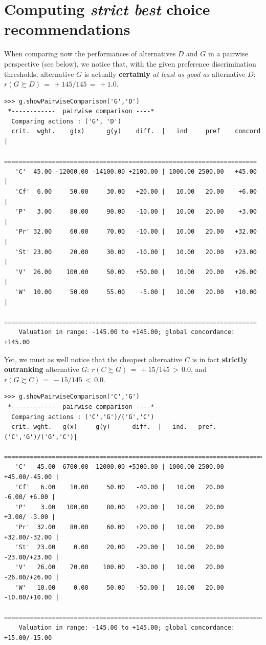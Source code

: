 \section{Computing \emph{strict best} choice recommendations}
\label{sec:6.4}

When comparing now the performances of alternatives $D$ and $G$ in a pairwise perspective (see below), we notice that, with the given preference discrimination thresholds, alternative $G$ is actually \textbf{certainly} \emph{at least as good as} alternative $D$:  $r(G \succsim D)\, = \, +145/145\, =\, +1.0$.

\begin{lstlisting}[caption={Inspecting pairwise comparisons},label=list:6.5]
>>> g.showPairwiseComparison('G','D')
 *------------  pairwise comparison ----*
  Comparing actions : ('G', 'D')
  crit.  wght.    g(x)      g(y)    diff.  |   ind     pref    concord 	|
   =====================================================================
   'C'  45.00 -12000.00 -14100.00 +2100.00 | 1000.00 2500.00   +45.00 	| 
   'Cf'  6.00     50.00     30.00   +20.00 |   10.00   20.00    +6.00 	| 
   'P'   3.00     80.00     90.00   -10.00 |   10.00   20.00    +3.00 	| 
   'Pr' 32.00     60.00     70.00   -10.00 |   10.00   20.00   +32.00 	| 
   'St' 23.00     20.00     30.00   -10.00 |   10.00   20.00   +23.00 	| 
   'V'  26.00    100.00     50.00   +50.00 |   10.00   20.00   +26.00 	| 
   'W'  10.00     50.00     55.00    -5.00 |   10.00   20.00   +10.00 	|
   =====================================================================
    Valuation in range: -145.00 to +145.00; global concordance: +145.00
\end{lstlisting}

Yet, we must as well notice that the cheapest alternative $C$ is in fact \textbf{strictly outranking} alternative $G$:  $r(C \succsim G)\, =\, +15/145\, >\, 0.0$, and $r(G \succsim C)\, =\, -15/145 \,<\, 0.0$.

\begin{lstlisting}
>>> g.showPairwiseComparison('C','G')
 *------------  pairwise comparison ----*
  Comparing actions : ('C','G')/('G','C')
  crit. wght.   g(x)     g(y)      diff.  |   ind.   pref. ('C','G')/('G','C')|
   ===========================================================================
   'C'   45.00 -6700.00 -12000.00 +5300.00 | 1000.00 2500.00    +45.00/-45.00 | 
   'Cf'   6.00    10.00     50.00   -40.00 |   10.00   20.00     -6.00/ +6.00 | 
   'P'    3.00   100.00     80.00   +20.00 |   10.00   20.00     +3.00/ -3.00 | 
   'Pr'  32.00    80.00     60.00   +20.00 |   10.00   20.00    +32.00/-32.00 | 
   'St'  23.00     0.00     20.00   -20.00 |   10.00   20.00    -23.00/+23.00 | 
   'V'   26.00    70.00    100.00   -30.00 |   10.00   20.00    -26.00/+26.00 | 
   'W'   10.00     0.00     50.00   -50.00 |   10.00   20.00    -10.00/+10.00 |
   ===========================================================================
    Valuation in range: -145.00 to +145.00; global concordance: +15.00/-15.00
\end{lstlisting}
  
